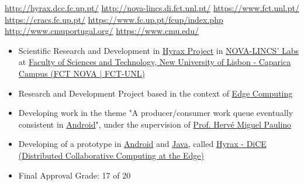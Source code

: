 \documentclass[10pt,a4paper,academicons]{altacv}
\begin{document}
{\href{http://hyrax.dcc.fc.up.pt/}{http://hyrax.dcc.fc.up.pt/}}
{\href{http://nova-lincs.di.fct.unl.pt/}{http://nova-lincs.di.fct.unl.pt/}\hspace{2em} \faGlobe\hspace{0.5em}\href{https://www.fct.unl.pt/}{https://www.fct.unl.pt/}}
{\href{https://cracs.fc.up.pt/}{https://cracs.fc.up.pt/}\hspace{2em} \faGlobe\hspace{0.5em}\href{https://www.fc.up.pt/fcup/index.php}{https://www.fc.up.pt/fcup/index.php}}
{\href{http://www.cmuportugal.org/}{http://www.cmuportugal.org/}\hspace{2em} \faGlobe\hspace{0.5em}\href{https://www.cmu.edu/}{https://www.cmu.edu/}}{}
\begin{itemize}
\item Scientific Research and Development in \href{http://hyrax.dcc.fc.up.pt/}{Hyrax Project} in \href{http://nova-lincs.di.fct.unl.pt/}{NOVA-LINCS' Labs} at \href{https://www.fct.unl.pt/}{Faculty of Sciences and Technology, New University of Lisbon - Caparica Campus (FCT NOVA | FCT-UNL)}
\item Research and Development Project based in the context of \href{https://en.wikipedia.org/wiki/Edge_computing/}{Edge Computing}
\item Developing work in the theme "A producer/consumer work queue eventually consistent in \href{https://www.android.com/}{Android}",
under the supervision of \href{https://docentes.fct.unl.pt/p161/}{Prof. Hervé Miguel Paulino}
\item Developing of a prototype in \href{https://www.android.com/}{Android} and \href{https://www.java.com/}{Java}, called \href{https://rubenandrebarreiro.github.io/research-development/hyrax-dice/presentation/hyrax-dice-presentation.pdf}{Hyrax - DiCE (Distributed Collaborative Computing at the Edge)}
\item Final Approval Grade: 17 of 20
\end{itemize}

\divider
\end{document}
